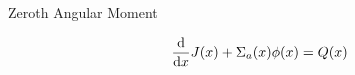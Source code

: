 \begin{frame}{Zeroth Angular Moment}




    \normalsize
    \onslide<+>
    \begin{equation*}
        \frac{\mathop{}\!\mathrm{d} }{\mathop{}\!\mathrm{d} x} J(x) + \Sigma_a(x) \phi(x) = Q(x)
    \end{equation*}

\end{frame}